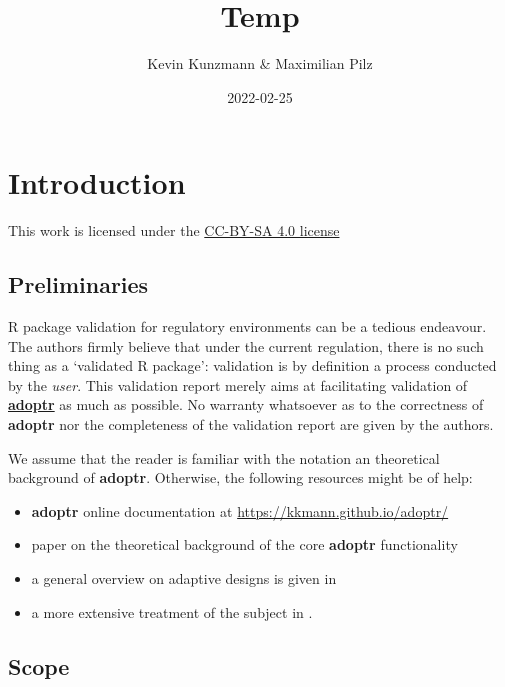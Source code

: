 \documentclass[
]{book}
\title{Temp}
\author{Kevin Kunzmann \& Maximilian Pilz}
\date{2022-02-25}
\providecommand{\tightlist}{%
  \setlength{\itemsep}{0pt}\setlength{\parskip}{0pt}}
\begin{document}
\maketitle

{
\setcounter{tocdepth}{1}
\tableofcontents
}
\hypertarget{introduction}{%
\chapter{Introduction}\label{introduction}}

This work is licensed under the \href{https://creativecommons.org/licenses/by-sa/4.0/deed.en}{CC-BY-SA 4.0 license}

\hypertarget{preliminaries}{%
\section{Preliminaries}\label{preliminaries}}

R package validation for regulatory environments can be a
tedious endeavour.
The authors firmly believe that under the current regulation,
there is no such thing as a `validated R package':
validation is by definition a process conducted by the \emph{user}.
This validation report merely aims at facilitating
validation of \textbf{\href{https://github.com/kkmann/adoptr}{adoptr}} as
much as possible.
No warranty whatsoever as to the correctness of \textbf{adoptr} nor the
completeness of the validation report are given by the authors.

We assume that the reader is familiar with the notation an theoretical
background of \textbf{adoptr}.
Otherwise, the following resources might be of help:

\begin{itemize}
\tightlist
\item
  \textbf{adoptr} online documentation at \url{https://kkmann.github.io/adoptr/}
\item
  paper on the theoretical background of the core \textbf{adoptr} functionality \citep{variational}
\item
  a general overview on adaptive designs is given in \citep{Bauer2015}
\item
  a more extensive treatment of the subject in \citep{Wassmer2016}.
\end{itemize}

\hypertarget{scope}{%
\section{Scope}\label{scope}}
\end{document}
